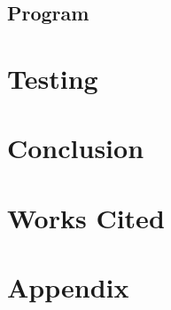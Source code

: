 \documentclass[11pt]{scrartcl}
\begin{document}
\subsection{Program}

\section{Testing}

\section{Conclusion}

\section{Works Cited}

\section{Appendix}
\end{document}
